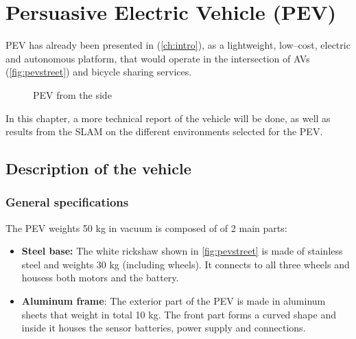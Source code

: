 
\chapter{Persuasive Electric Vehicle (PEV)}
\label{ch:pev}

PEV has already been presented in (\autoref{ch:intro}), as a lightweight, low--cost, electric and autonomous platform, that would operate in the intersection of AVs (\autoref{fig:pevstreet}) and bicycle sharing services.
\begin{figure}[h]
  \centering
  \caption{PEV from the side}
  \label{fig:pevstreet}
\end{figure}

In this chapter, a more technical report of the vehicle will be done, as well as results from the SLAM on the different environments selected for the PEV.

\section{Description of the vehicle}


\subsection{General specifications}
The PEV weights 50 kg in vacuum is composed of of 2 main parts:
\begin{itemize}
  \item \textbf{Steel base:} The white rickshaw shown in \autoref{fig:pevstreet} is made of stainless steel and weights 30 kg (including wheels). It connects to all three wheels and housess  both motors and the battery.

  \item \textbf{Aluminum frame}: The exterior part of the PEV is made in aluminum sheets that weight in total 10 kg. The front part forms a curved shape and inside it houses the sensor batteries, power supply and connections.
\end{itemize}

